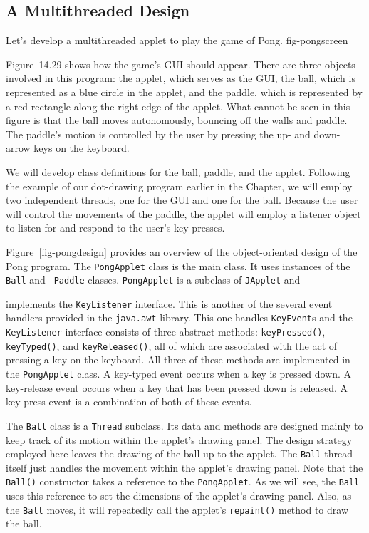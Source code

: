 \subsection{A Multithreaded Design}

Let's develop a multithreaded applet to play the game of Pong.
{fig-pongscreen}

Figure~14.29 shows how the game's GUI should appear.  There
are three objects involved in this program: the applet, which serves
as the GUI, the ball, which is represented as a blue circle in the
applet, and the paddle, which is represented by a red rectangle along
the right edge of the applet. What cannot be seen in this figure is 
that the ball moves autonomously, bouncing off the walls and paddle.
The paddle's motion is controlled by the user by pressing the up- and
down-arrow keys on the keyboard. 

We will develop class definitions for the ball, paddle, and the
applet. Following the example of our dot-drawing program earlier in
the Chapter, we will employ two independent threads, one for the GUI
and one for the ball.  Because the user will control the movements of
the paddle, the applet will employ a listener object to listen for and
respond to the user's key presses. 

Figure~\ref{fig-pongdesign} provides an overview of the
object-oriented design of the Pong program. The {\tt PongApplet} class
is the main class. It uses instances of the {\tt Ball} and {\tt
Paddle} classes.  {\tt PongApplet} is a subclass of {\tt JApplet} and
\begin{figure}[h!]
\end{figure}
implements the {\tt KeyListener} interface. This is another of the
several event handlers provided in the {\tt java.awt} library. This
one handles {\tt KeyEvent}s and the {\tt KeyListener} interface
consists of three abstract methods: {\tt keyPressed()}, {\tt
keyTyped()}, and {\tt keyReleased()}, all of which are associated with
the act of pressing a key on the keyboard. All three of these
methods are implemented in the {\tt PongApplet} class.  A key-typed
event occurs when a key is pressed down. A key-release event occurs
when a key that has been pressed down is released.  A key-press event
is a combination of both of these events.

The {\tt Ball} class is a {\tt Thread} subclass. Its data and methods
are designed mainly to keep track of its motion within the applet's
drawing panel. The design strategy employed here leaves the drawing of
the ball up to the applet. The {\tt Ball} thread itself just 
handles the movement within the applet's drawing panel.  Note that the {\tt
Ball()} constructor takes a reference to the {\tt PongApplet}. As we
will see, the {\tt Ball} uses this reference to set the dimensions of
the applet's drawing panel. Also, as the {\tt Ball} moves, it will
repeatedly call the applet's {\tt repaint()} method to draw the ball.

